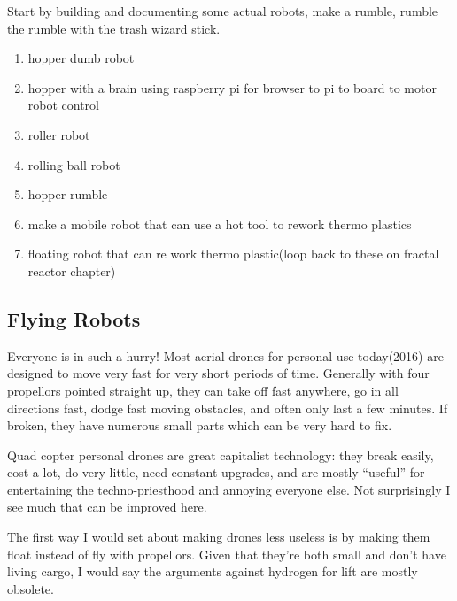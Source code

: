 Start by building and documenting some actual robots, make a rumble,
rumble the rumble with the trash wizard stick.

\begin{enumerate}
\def\labelenumi{\arabic{enumi}.}
\tightlist
\item
  hopper dumb robot
\item
  hopper with a brain using raspberry pi for browser to pi to board to
  motor robot control
\item
  roller robot
\item
  rolling ball robot
\item
  hopper rumble
\item
  make a mobile robot that can use a hot tool to rework thermo plastics
\item
  floating robot that can re work thermo plastic(loop back to these on
  fractal reactor chapter)
\end{enumerate}

\subsection{Flying Robots}\label{flying-robots}

Everyone is in such a hurry! Most aerial drones for personal use
today(2016) are designed to move very fast for very short periods of
time. Generally with four propellors pointed straight up, they can take
off fast anywhere, go in all directions fast, dodge fast moving
obstacles, and often only last a few minutes. If broken, they have
numerous small parts which can be very hard to fix.

Quad copter personal drones are great capitalist technology: they break
easily, cost a lot, do very little, need constant upgrades, and are
mostly ``useful'' for entertaining the techno-priesthood and annoying
everyone else. Not surprisingly I see much that can be improved here.

The first way I would set about making drones less useless is by making
them float instead of fly with propellors. Given that they're both small
and don't have living cargo, I would say the arguments against hydrogen
for lift are mostly obsolete.

